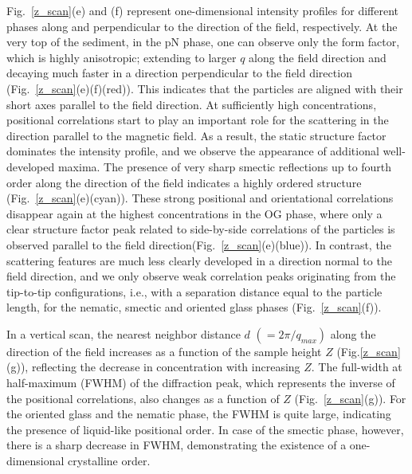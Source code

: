 \documentclass[aps,prl,preprint,superscriptaddress,showkeys]{revtex4-2} %
\begin{document}
Fig.~\ref{z_scan}(e) and (f) represent one-dimensional intensity profiles for different phases along and perpendicular to the direction of the field, respectively. At the very top of the sediment, in the pN phase, one can observe only the form factor, which is highly anisotropic; extending to larger $q$ along the field direction and decaying much faster in a direction perpendicular to the field direction (Fig.~\ref{z_scan}(e)(f)(red)). This indicates that the particles are aligned with their short axes parallel to the field direction. At sufficiently high concentrations, positional correlations start to play an important role for the scattering in the direction parallel to the magnetic field. As a result, the static structure factor dominates the intensity profile, and we observe the appearance of additional well-developed maxima. The presence of very sharp smectic reflections up to fourth order along the direction of the field indicates a highly ordered structure (Fig.~\ref{z_scan}(e)(cyan)). These strong positional and orientational correlations disappear again at the highest concentrations in the OG phase, where only a clear structure factor peak related to side-by-side correlations of the particles is observed parallel to the field direction(Fig.~\ref{z_scan}(e)(blue)). In contrast, the scattering features are much less clearly developed in a direction normal to the field direction, and we only observe weak correlation peaks originating from the tip-to-tip configurations, i.e., with a separation distance equal to the particle length, for the nematic, smectic and oriented glass phases (Fig.~\ref{z_scan}(f)). \par
In a vertical scan, the nearest neighbor distance $d$ $(=2\pi/q_{max})$ along the direction of the field increases as a function of the sample height $Z$ (Fig.\ref{z_scan}(g)), reflecting the decrease in concentration with increasing $Z$. The full-width at half-maximum (FWHM) of the diffraction peak, which represents the inverse of the positional correlations, also changes as a function of $Z$ (Fig.~\ref{z_scan}(g)). For the oriented glass and the nematic phase, the FWHM is quite large, indicating the presence of liquid-like positional order. In case of the smectic phase, however, there is a sharp decrease in FWHM, demonstrating the existence of a one-dimensional crystalline order.\par   %
\end{document}
